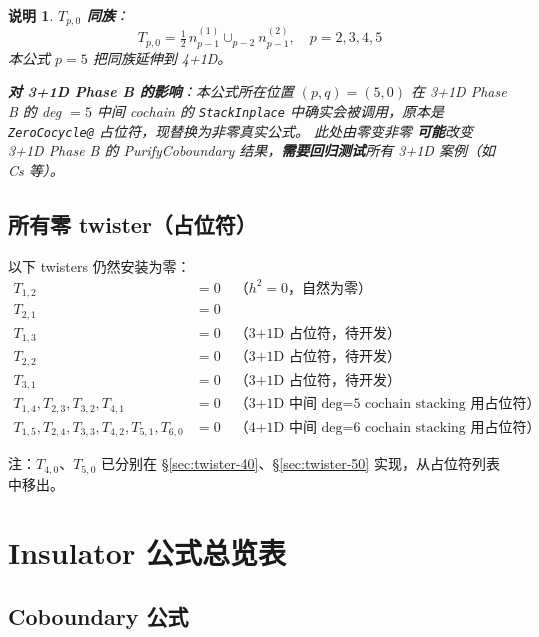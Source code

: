 \documentclass[a4paper,fontset=ubuntu,12pt]{ctexart}
\newtheorem{remark}[definition]{说明}
\begin{document}
\begin{remark}
\textbf{$T_{p, 0}$ 同族}：
\[
T_{p, 0} = \tfrac{1}{2}\, n_{p-1}^{(1)} \cup_{p-2} n_{p-1}^{(2)}, \quad p = 2, 3, 4, 5
\]
本公式 $p = 5$ 把同族延伸到 4+1D。

\textbf{对 3+1D Phase B 的影响}：本公式所在位置 $(p, q) = (5, 0)$ 在 3+1D Phase B 的 deg $= 5$ 中间 cochain 的 \texttt{StackInplace} 中确实会被调用，原本是 \texttt{ZeroCocycle@} 占位符，现替换为非零真实公式。
此处由零变非零 \textbf{可能}改变 3+1D Phase B 的 PurifyCoboundary 结果，\textbf{需要回归测试}所有 3+1D 案例（如 Cs 等）。
\end{remark}

\subsection{所有零 twister（占位符）}

以下 twisters 仍然安装为零：
\begin{align}
T_{1,2} &= 0 \quad \text{（$h^2 = 0$，自然为零）} \\
T_{2,1} &= 0 \\
T_{1,3} &= 0 \quad \text{（3+1D 占位符，待开发）} \\
T_{2,2} &= 0 \quad \text{（3+1D 占位符，待开发）} \\
T_{3,1} &= 0 \quad \text{（3+1D 占位符，待开发）} \\
T_{1,4}, T_{2,3}, T_{3,2}, T_{4,1} &= 0 \quad \text{（3+1D 中间 deg=5 cochain stacking 用占位符）} \\
T_{1,5}, T_{2,4}, T_{3,3}, T_{4,2}, T_{5,1}, T_{6,0} &= 0 \quad \text{（4+1D 中间 deg=6 cochain stacking 用占位符）}
\end{align}

注：$T_{4,0}$、$T_{5,0}$ 已分别在 \S\ref{sec:twister-40}、\S\ref{sec:twister-50} 实现，从占位符列表中移出。

\section{Insulator 公式总览表}
\label{sec:summary-table}

\subsection{Coboundary 公式}
\end{document}
